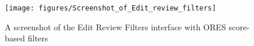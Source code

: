 \begin{figure}[h]
  \centering
  \texttt{[image: figures/Screenshot\_of\_Edit\_review\_filters]}
  \caption{A screenshot of the Edit Review Filters interface with ORES score-based filters}
  \label{fig:edit_review_filters_screenshot}
\end{figure}
